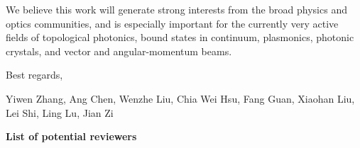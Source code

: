 \documentclass[a4paper,12pt]{article}
\begin{document}
\begin{spacing}{1.0}
\noindent We believe this work will generate strong interests from the broad physics and optics communities, and is especially important for the currently very active fields of topological photonics, bound states in continuum, plasmonics, photonic crystals, and vector and angular-momentum beams.

\bigskip

\noindent Best regards,

\noindent Yiwen Zhang, Ang Chen, Wenzhe Liu, Chia Wei Hsu, Fang Guan, Xiaohan Liu, Lei Shi, Ling Lu, Jian Zi



\begin{figure}[h]
\centering
{}
\quad\quad
{}
\end{figure}

\newpage

\begin{flushleft}
\textbf{List of potential reviewers}
\end{flushleft}



\end{spacing}
\end{document}
